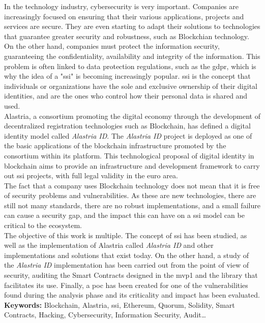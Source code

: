     In the technology industry, cybersecurity is very important.  Companies are increasingly focused on ensuring that their various applications, projects and services are secure.  They are even starting to adapt their solutions to technologies that guarantee greater security and robustness, such as Blockchian technology.\\
    
    On the other hand, companies must protect the information security, guaranteeing the confidentiality, availability and integrity of the information. This problem is often linked to data protection regulations, such as the \acrshort{gdpr}, which is why the idea of a "\acrlong{ssi}" is becoming increasingly popular.  \acrfull{ssi} is the concept that individuals or organizations have the sole and exclusive ownership of their digital identities, and are the ones who control how their personal data is shared and used.\\

    Alastria, a consortium promoting the digital economy through the development of decentralized registration technologies such as Blockchain, has defined a digital identity model called \textit{Alastria ID}. The \textit{Alastria ID} project is deployed as one of the basic applications of the blockchain infrastructure promoted by the consortium within its platform.  This technological proposal of digital identity in blockchain aims to provide an infrastructure and development framework to carry out \acrfull{ssi} projects, with full legal validity in the euro area.\\

    The fact that a company uses Blockchain technology does not mean that it is free of security problems and vulnerabilities.  As these are new technologies, there are still not many standards, there are no robust implementations, and a small failure can cause a security gap, and the impact this can have on a \acrlong{ssi} model can be critical to the ecosystem.\\
    
    The objective of this work is multiple. The concept of \acrfull{ssi} has been studied, as well as the implementation of Alastria called \textit{Alastria ID} and other implementations and solutions that exist today. On the other hand, a study of the \textit{Alastria ID} implementation has been carried out from the point of view of security, auditing the Smart Contracts designed in the \acrshort{mvp}1 and the library that facilitates its use. Finally, a \acrlong{poc} has been created for one of the vulnerabilities found during the analysis phase and its criticality and impact has been evaluated.\\
    
    \textbf{Keywords:} Blockchain, Alastria, \acrlong{ssi}, Ethereum, Quorum, Solidity, Smart Contracts, Hacking, Cybersecurity, Information Security, Audit\ldots

